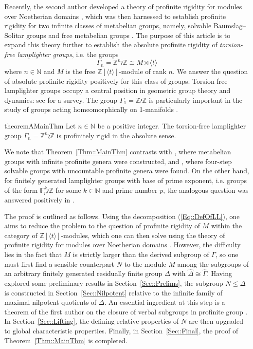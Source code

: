 \documentclass{amsart}
\numberwithin{theorem}{section}
\numberwithin{equation}{section}
\newcommand{\Z}{\mathbb{Z}}
\newcommand{\hD}{\widehat{\Delta}}
\newcommand{\hG}{\widehat{\Gamma}}
\begin{document}
Recently, the second author developed a theory of profinite rigidity for modules over Noetherian domains \cite{Wykowski2025_2}, which was then harnessed to establish profinite rigidity for two infinite classes of metabelian groups, namely, solvable Baumslag--Solitar groups \cite{Wykowski2025_2} and free metabelian groups \cite{Wykowski2025_3}. The purpose of this article is to expand this theory further to establish the absolute profinite rigidity of \emph{torsion-free lamplighter groups}, i.e. the groups
\begin{equation} \label{Eq::DefOfLL}
\Gamma_n = \Z^n \wr \Z \cong M \rtimes \langle t\rangle
\end{equation}
where $n \in \mathbb{N}$ and $M$ is the free $\Z[\langle t\rangle]$-module of rank $n$. We answer the question of absolute profinite rigidity positively for this class of groups. Torsion-free lamplighter groups occupy a central position in geometric group theory and dynamics: see \cite{Genevois2024} for a survey. The group $\Gamma_1 = \Z \wr \Z$ is particularly important in the study of groups acting homeomorphically on 1-manifolds \cite{Cannon1996,Balasubramanya2024}.

\begin{restatable}{theoremA}{MainThm}
    \label{Thm::MainThm}
    Let $n \in \mathbb{N}$ be a positive integer. The torsion-free lamplighter group $\Gamma_n = \Z^n \wr \Z$ is profinitely rigid in the absolute sense.
\end{restatable}

We note that Theorem~\ref{Thm::MainThm} contrasts with \cite{Pickel1974}, where metabelian groups with infinite profinite genera were constructed, and \cite{Nikolov2021}, where four-step solvable groups with uncountable profinite genera were found. On the other hand, for finitely generated lamplighter groups with base of prime exponent, i.e. groups of the form $\mathbb{F}_p^k \wr \Z$ for some $k \in \mathbb{N}$ and prime number $p$, the analogous question was answered positively in \cite{Blachar2025}.

The proof is outlined as follows. Using the decomposition (\ref{Eq::DefOfLL}), one aims to reduce the problem to the question of profinite rigidity of $M$ within the category of $\Z[\langle t \rangle]$-modules, which one can then solve using the theory of profinite rigidity for modules over Noetherian domains \cite{Wykowski2025_2}. However, the difficulty lies in the fact that $M$ is strictly larger than the derived subgroup of $\Gamma$, so one must first find a sensible counterpart $N$ to the module $M$ among the subgroups of an arbitrary finitely generated residually finite group $\Delta$ with $\hD \cong \hG$. Having explored some preliminary results in Section~\ref{Sec::Prelims}, the subgroup $N \leq \Delta$ is constructed in Section~\ref{Sec::Nilpotent} relative to the infinite family of maximal nilpotent quotients of $\Delta$. An essential ingredient at this step is a theorem of the first author on the closure of verbal subgroups in profinite group \cite[Theorem 1.4]{Nikolov2007}. In Section~\ref{Sec::Lifting}, the defining relative properties of $N$ are then upgraded to global characteristic properties. Finally, in Section~\ref{Sec::Final}, the proof of Theorem~\ref{Thm::MainThm} is completed.
\end{document}
